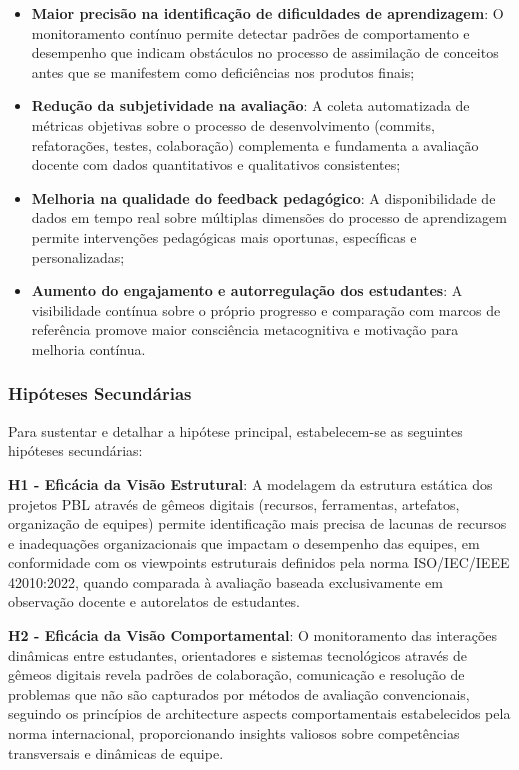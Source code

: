 \documentclass[12pt,a4paper]{article}
\begin{document}
\begin{itemize}
\item \textbf{Maior precisão na identificação de dificuldades de aprendizagem}: O monitoramento contínuo permite detectar padrões de comportamento e desempenho que indicam obstáculos no processo de assimilação de conceitos antes que se manifestem como deficiências nos produtos finais;

\item \textbf{Redução da subjetividade na avaliação}: A coleta automatizada de métricas objetivas sobre o processo de desenvolvimento (commits, refatorações, testes, colaboração) complementa e fundamenta a avaliação docente com dados quantitativos e qualitativos consistentes;

\item \textbf{Melhoria na qualidade do feedback pedagógico}: A disponibilidade de dados em tempo real sobre múltiplas dimensões do processo de aprendizagem permite intervenções pedagógicas mais oportunas, específicas e personalizadas;

\item \textbf{Aumento do engajamento e autorregulação dos estudantes}: A visibilidade contínua sobre o próprio progresso e comparação com marcos de referência promove maior consciência metacognitiva e motivação para melhoria contínua.
\end{itemize}

\subsubsection{Hipóteses Secundárias}

Para sustentar e detalhar a hipótese principal, estabelecem-se as seguintes hipóteses secundárias:

\textbf{H1 - Eficácia da Visão Estrutural}: A modelagem da estrutura estática dos projetos PBL através de gêmeos digitais (recursos, ferramentas, artefatos, organização de equipes) permite identificação mais precisa de lacunas de recursos e inadequações organizacionais que impactam o desempenho das equipes, em conformidade com os viewpoints estruturais definidos pela norma ISO/IEC/IEEE 42010:2022, quando comparada à avaliação baseada exclusivamente em observação docente e autorelatos de estudantes.

\textbf{H2 - Eficácia da Visão Comportamental}: O monitoramento das interações dinâmicas entre estudantes, orientadores e sistemas tecnológicos através de gêmeos digitais revela padrões de colaboração, comunicação e resolução de problemas que não são capturados por métodos de avaliação convencionais, seguindo os princípios de architecture aspects comportamentais estabelecidos pela norma internacional, proporcionando insights valiosos sobre competências transversais e dinâmicas de equipe.
\end{document}
